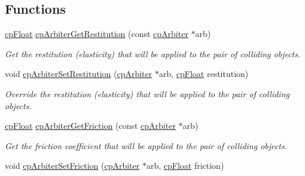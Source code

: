 \subsection*{Functions}
\begin{DoxyCompactItemize}
\item 
\hypertarget{group__cp_arbiter_ga8f84e4ad8c1289904b8030fa4949713e}{}\hyperlink{group__basic_types_gac1ed65573e035bf892505768c852d8d3}{cp\+Float} \hyperlink{group__cp_arbiter_ga8f84e4ad8c1289904b8030fa4949713e}{cp\+Arbiter\+Get\+Restitution} (const \hyperlink{structcp_arbiter}{cp\+Arbiter} $\ast$arb)\label{group__cp_arbiter_ga8f84e4ad8c1289904b8030fa4949713e}

\begin{DoxyCompactList}\small\item\em Get the restitution (elasticity) that will be applied to the pair of colliding objects. \end{DoxyCompactList}\item 
\hypertarget{group__cp_arbiter_ga5486e6d8a0ea6b67300b19269d474646}{}void \hyperlink{group__cp_arbiter_ga5486e6d8a0ea6b67300b19269d474646}{cp\+Arbiter\+Set\+Restitution} (\hyperlink{structcp_arbiter}{cp\+Arbiter} $\ast$arb, \hyperlink{group__basic_types_gac1ed65573e035bf892505768c852d8d3}{cp\+Float} restitution)\label{group__cp_arbiter_ga5486e6d8a0ea6b67300b19269d474646}

\begin{DoxyCompactList}\small\item\em Override the restitution (elasticity) that will be applied to the pair of colliding objects. \end{DoxyCompactList}\item 
\hypertarget{group__cp_arbiter_ga08381fa73b5db1359f6608b770757fd5}{}\hyperlink{group__basic_types_gac1ed65573e035bf892505768c852d8d3}{cp\+Float} \hyperlink{group__cp_arbiter_ga08381fa73b5db1359f6608b770757fd5}{cp\+Arbiter\+Get\+Friction} (const \hyperlink{structcp_arbiter}{cp\+Arbiter} $\ast$arb)\label{group__cp_arbiter_ga08381fa73b5db1359f6608b770757fd5}

\begin{DoxyCompactList}\small\item\em Get the friction coefficient that will be applied to the pair of colliding objects. \end{DoxyCompactList}\item 
\hypertarget{group__cp_arbiter_ga052a22bbb0ff81d01329de9d53baa29b}{}void \hyperlink{group__cp_arbiter_ga052a22bbb0ff81d01329de9d53baa29b}{cp\+Arbiter\+Set\+Friction} (\hyperlink{structcp_arbiter}{cp\+Arbiter} $\ast$arb, \hyperlink{group__basic_types_gac1ed65573e035bf892505768c852d8d3}{cp\+Float} friction)\label{group__cp_arbiter_ga052a22bbb0ff81d01329de9d53baa29b}


\end{DoxyCompactItemize}
